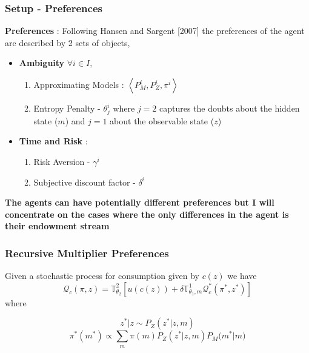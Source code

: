 \documentclass{beamer}
\theoremstyle{definition}
\begin{document}

\begin{frame}
\frametitle{Setup - Preferences}
\textbf{Preferences} : Following Hansen and Sargent [2007] the preferences of the agent are described by 2 sets of objects, 
\begin{itemize}
	\item \textbf{Ambiguity}
%	
$\forall i \in I,$
\begin{enumerate}
	\item Approximating Models :   $\left\langle  P^i_M,P_Z^i, \pi^i \right\rangle$
	\item Entropy Penalty - $\theta_j^i$ where $j=2$ captures the doubts about the hidden state ($m$) and $j=1$ about the observable state ($z$)
\end{enumerate}
\item \textbf{Time and Risk} :
\begin{enumerate}
	\item Risk Aversion - $\gamma^i$
	\item Subjective discount factor - $\delta^i$
\end{enumerate}
 \end{itemize}

\textbf{The agents can have potentially different preferences but I will concentrate on the cases where the only differences in the agent is their endowment stream}
%
\end{frame}


\begin{frame}
\frametitle{Recursive Multiplier Preferences}
Given a stochastic process for consumption given by $c(z)$ we have 
\[\mathcal{Q}_c(\pi,z)=\mathbb{T}^2_{\theta_2}\left[u(c(z))+\delta\mathbb{T}^1_{\theta_1,m} \mathcal{Q}_c^*(\pi^*,z^*)\right]\]
where

\[z^*|z \sim P_Z(z^*|z,m)\]
\[\pi^{*}(m^*)\propto \sum_{m}{\pi(m) P_Z(z^*|z,m)P_M(m^*}|m)\]

\end{frame}
\end{document}
